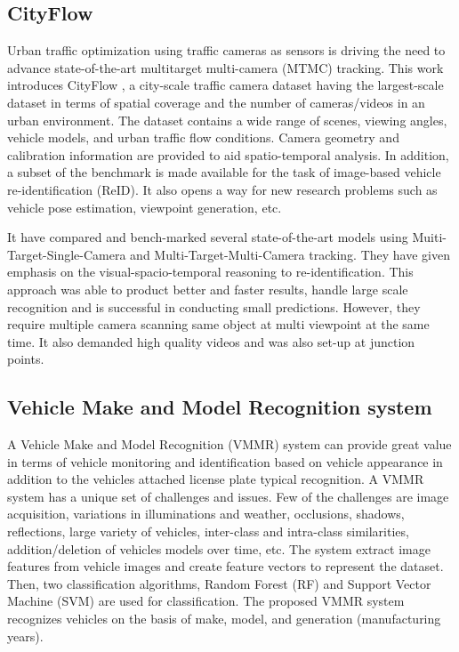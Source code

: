 \subsection{CityFlow}
Urban traffic optimization using traffic cameras as sensors is driving the need to advance state-of-the-art multitarget multi-camera (MTMC) tracking. This work  introduces CityFlow \cite{Tang_2019_CVPR}, a city-scale traffic camera dataset having the largest-scale dataset in terms of spatial coverage and the number of cameras/videos in an urban environment. The dataset contains a wide range of scenes, viewing angles, vehicle models, and urban traffic flow conditions. Camera geometry and calibration information are provided to aid spatio-temporal analysis. In addition, a subset of the benchmark is made available for the task of image-based vehicle re-identification (ReID). It also opens a way for new research problems such as vehicle pose estimation, viewpoint generation, etc.

It have compared and bench-marked several state-of-the-art models using Muiti-Target-Single-Camera and Multi-Target-Multi-Camera tracking. They have given emphasis on the visual-spacio-temporal reasoning to re-identification. This approach was able to product better and faster results, handle large scale recognition and is successful in conducting small predictions. However, they require multiple camera scanning same object at multi viewpoint at the same time. It also demanded high quality videos and was also set-up at junction points.

\subsection{Vehicle Make and Model Recognition system}
A Vehicle Make and Model Recognition (VMMR) system \cite{manzoor2019real} can provide great value in terms of
vehicle monitoring and identification based on vehicle appearance in addition to the vehicles attached license plate typical recognition. A VMMR system has a unique set of challenges and issues. Few of the challenges are image acquisition, variations in illuminations and weather, occlusions, shadows, reflections, large variety of vehicles, inter-class and intra-class similarities, addition/deletion of vehicles models over time, etc. The system extract image features from vehicle images and create feature vectors to represent the dataset. Then, two classification algorithms, Random Forest (RF) and Support Vector Machine (SVM) are used for classification. The proposed VMMR system recognizes vehicles on the basis of make, model, and generation (manufacturing years).

